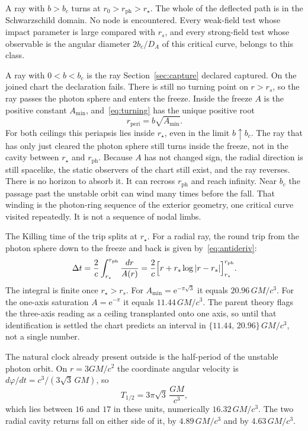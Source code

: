 \documentclass[a4paper]{article}
\begin{document}
A ray with \(b>b_c\) turns at \(r_0>r_{\mathrm{ph}}>r_\star\). The whole of the deflected path is in the Schwarzschild domain. No node is encountered. Every weak-field test whose impact parameter is large compared with \(r_s\), and every strong-field test whose observable is the angular diameter \(2b_c/D_A\) of this critical curve, belongs to this class.

A ray with \(0<b<b_c\) is the ray Section~\ref{sec:capture} declared captured. On the joined chart the declaration fails. There is still no turning point on \(r>r_s\), so the ray passes the photon sphere and enters the freeze. Inside the freeze \(A\) is the positive constant \(A_{\min}\), and~\eqref{eq:turning} has the unique positive root
\begin{equation}
\label{eq:periapsis}
r_{\mathrm{peri}}=b\sqrt{A_{\min}}.
\end{equation}
For both ceilings this periapsis lies inside \(r_\star\), even in the limit \(b\uparrow b_c\). The ray that has only just cleared the photon sphere still turns inside the freeze, not in the cavity between \(r_\star\) and \(r_{\mathrm{ph}}\). Because \(A\) has not changed sign, the radial direction is still spacelike, the static observers of the chart still exist, and the ray reverses. There is no horizon to absorb it. It can recross \(r_{\mathrm{ph}}\) and reach infinity. Near \(b_c\) the passage past the unstable orbit can wind many times before the fall. That winding is the photon-ring sequence of the exterior geometry, one critical curve visited repeatedly. It is not a sequence of nodal limbs.

The Killing time of the trip splits at \(r_\star\). For a radial ray, the round trip from the photon sphere down to the freeze and back is given by~\eqref{eq:antideriv}:
\begin{equation}
\label{eq:echo-delay}
\Delta t
  =\frac{2}{c}\int_{r_\star}^{r_{\mathrm{ph}}}\frac{dr}{A(r)}
  =\frac{2}{c}\Bigl[r+r_s\log|r-r_s|\Bigr]_{r_\star}^{r_{\mathrm{ph}}}.
\end{equation}
The integral is finite once \(r_\star>r_s\). For \(A_{\min}=\mathrm{e}^{-\pi\sqrt{3}}\) it equals \(20.96\,GM/c^3\). For the one-axis saturation \(A=\mathrm{e}^{-\pi}\) it equals \(11.44\,GM/c^3\). The parent theory flags the three-axis reading as a ceiling transplanted onto one axis, so until that identification is settled the chart predicts an interval in \(\{11.44,\,20.96\}\,GM/c^3\), not a single number.

The natural clock already present outside is the half-period of the unstable photon orbit. On \(r=3GM/c^2\) the coordinate angular velocity is \(d\varphi/dt=c^3/(3\sqrt{3}\,GM)\), so
\begin{equation}
\label{eq:half-orbit}
T_{1/2}=3\pi\sqrt{3}\,\frac{GM}{c^3},
\end{equation}
which lies between \(16\) and \(17\) in these units, numerically \(16.32\,GM/c^3\). The two radial cavity returns fall on either side of it, by \(4.89\,GM/c^3\) and by \(4.63\,GM/c^3\).
\end{document}

